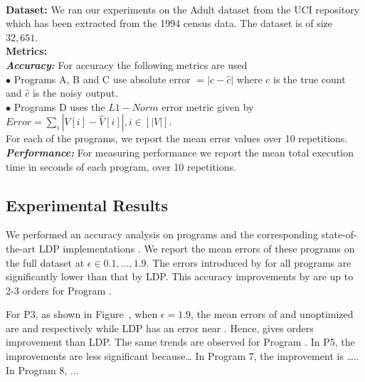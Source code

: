 {\\\textbf{Dataset:}
We ran our experiments on the Adult dataset from the UCI repository \cite{UCI}  which has been extracted from the 1994 census data. The dataset is of size $32,651$.
\\\textbf{Metrics:}
\\\textbf{\textit{Accuracy:}} For accuracy the following metrics are used
\\$\bullet$ Programs A, B and C use absolute error $ =|c-\hat{c}|$ where $c$ is the true count and $\hat{c}$ is the noisy output.\\ $\bullet$ Programs D uses the $L1-Norm$ error metric given  by $Error=\sum_{i}|V[i]-\hat{V}[i]|, i \in [|V|]$.\\
For each of the programs, we report the mean error values over 10 repetitions.\\
\textbf{\textit{Performance:}} For measuring performance we report the mean total execution time in seconds of each program, over 10 repetitions. 
}



\subsection{Experimental Results}
 We performed an accuracy analysis on \system programs and the corresponding state-of-the-art \textsf{LDP} implementations \cite{LDP1}. We report the mean errors of these programs on the full dataset at $\epsilon \in {0.1,\ldots,1.9}$. The errors introduced by \system for all programs are significantly lower than that by LDP. This accuracy improvements by \system are up to 2-3 orders for Program .

For P3, as shown in Figure~\cite{}, when $\epsilon = 1.9$, the mean errors of \system and unoptimized \system are  and   respectively  while LDP has an error near . Hence, \system gives  orders improvement than LDP. The same trends are observed for Program \xh{}. In P5, the improvements are less significant because…  In Program 7, the improvement is ….. In Program 8, ...

